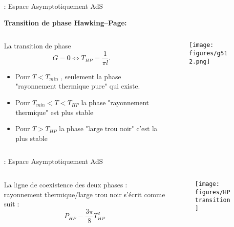\begin{frame}[t]{\underline{\secname} : Espace Asymptotiquement AdS}
\begin{center}
	\textbf{Transition de phase Hawking–Page:}
\end{center}

\begin{columns}
	\begin{column}{0.5\linewidth}
		 La transition de phase 
		$$G=0 \Leftrightarrow T_{HP}=\dfrac{1}{\pi l}.$$
	\begin{itemize} \setlength\itemsep{0em}
		\item  Pour $T < T_{min}$ , seulement la phase "rayonnement thermique pure" qui existe.
		\item  Pour $T_{min} < T < T_{HP}$ la phase "rayonnement thermique" est plus stable
		\item  Pour $T > T_{HP}$ la phase "large trou noir" c'est la plus stable
		
	\end{itemize}
		
		
	\end{column}
	\begin{column}{0.5\linewidth}
		\begin{figure}
			\begin{center}
				\texttt{[image: figures/g512.png]}
				\label{Fig:Gschads}
			\end{center}
		\end{figure}
		
		
	\end{column}
\end{columns}
\end{frame}

\begin{frame}{\underline{\secname} : Espace Asymptotiquement AdS}

\begin{columns}
	\begin{column}{0.5\linewidth}
La ligne de coexistence des deux phases : rayonnement thermique/large trou noir s'écrit comme suit :
$$
P_{HP} =\frac{3 \pi}{8} T^2_{HP} 
$$
	\end{column}
\begin{column}{0.5\linewidth}
\begin{figure}
	\begin{center}
		\texttt{[image: figures/HPtransition]}
	\end{center}
\end{figure}


\end{column}
\end{columns}
\end{frame}

